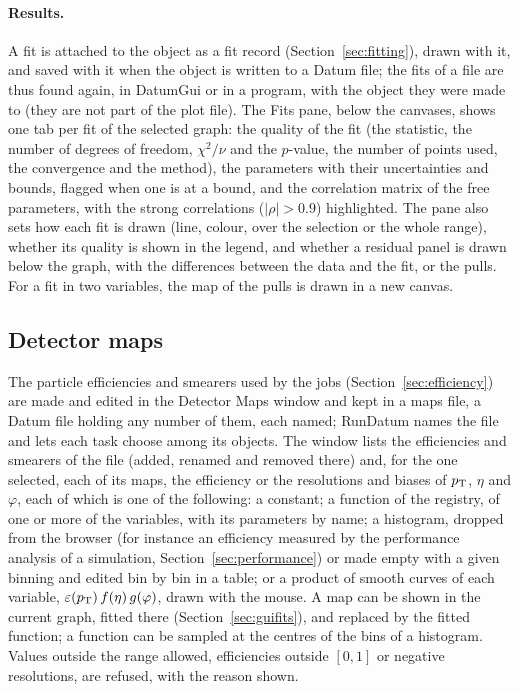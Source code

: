 \paragraph{Results.}
A fit is attached to the object as a fit record (Section~\ref{sec:fitting}), drawn with it, and saved with it when
the object is written to a Datum file; the fits of a file are thus found again, in DatumGui or in a program, with the
object they were made to (they are not part of the plot file). The Fits pane, below the canvases, shows one tab per fit of the selected graph: the
quality of the fit (the statistic, the number of degrees of freedom, $\chi^2/\nu$ and the $p$-value, the number of
points used, the convergence and the method), the parameters with their uncertainties and bounds, flagged when one
is at a bound, and the correlation matrix of the free parameters, with the strong correlations ($|\rho|>0.9$)
highlighted. The pane also sets how each fit is drawn (line, colour, over the selection or the whole range), whether
its quality is shown in the legend, and whether a residual panel is drawn below the graph, with the differences
between the data and the fit, or the pulls. For a fit in two variables, the map of the pulls is drawn in a new
canvas.

\subsection{Detector maps}
\label{sec:guimaps}

The particle efficiencies and smearers used by the jobs (Section~\ref{sec:efficiency}) are made and edited in the
Detector Maps window and kept in a maps file, a Datum file holding any number of them, each named; RunDatum names the
file and lets each task choose among its objects. The window lists the efficiencies and smearers of the file (added,
renamed and removed there) and, for the one selected, each of its maps, the efficiency or the resolutions and biases
of $p_{\mathrm{T}}$, $\eta$ and $\varphi$, each of which is one of the following:
a constant; a function of the registry, of one or more of the variables, with its parameters by name; a histogram,
dropped from the browser (for instance an efficiency measured by the performance analysis of a simulation,
Section~\ref{sec:performance}) or made empty with a given binning and edited bin by bin in a table; or a product of
smooth curves of each variable, $\varepsilon(p_{\mathrm{T}})\, f(\eta)\, g(\varphi)$, drawn with the mouse. A map can be shown in
the current graph, fitted there (Section~\ref{sec:guifits}), and replaced by the fitted function; a function can be sampled
at the centres of the bins of a histogram. Values outside the range allowed, efficiencies outside $[0,1]$ or negative
resolutions, are refused, with the reason shown.

